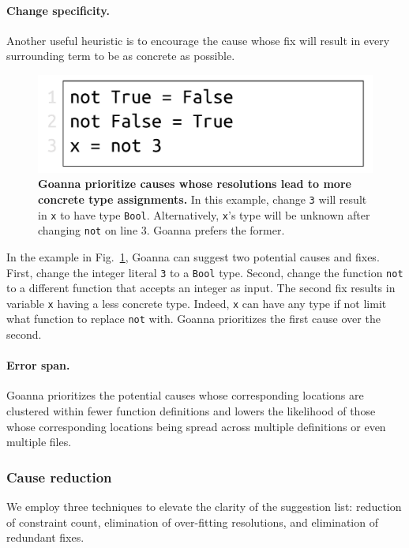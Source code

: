     \paragraph{Change specificity.}
	Another useful heuristic is to encourage the cause whose fix will result in every surrounding term to be as concrete as possible.
	
	
   \begin{figure}[ht!]
        \centering
        \includegraphics[width=0.5\linewidth]{images/Specificity}
        \caption[Goanna prioritize causes whose resolutions lead to more concrete type assignments]{\textbf{Goanna prioritize causes whose resolutions lead to more concrete type assignments.} In this example, change \texttt{3} will result in \texttt{x} to have type \texttt{Bool}. Alternatively, \texttt{x}'s type will be unknown after changing \texttt{not} on line 3. Goanna prefers the former.} 
        \label{fig:specificity}
    \end{figure}

    In the example in Fig.~\ref{fig:specificity}, Goanna can suggest two potential causes and fixes. First, change the integer literal \texttt{3} to a \texttt{Bool} type. Second, change the function \texttt{not} to a different function that accepts an integer as input. The second fix results in variable \texttt{x} having a less concrete type. Indeed, \texttt{x} can have any type if not limit what function to replace \texttt{not} with. Goanna prioritizes the first cause over the second. 

    \paragraph{Error span.}
    Goanna prioritizes the potential causes whose corresponding locations are clustered within fewer function definitions and lowers the likelihood of those whose corresponding locations being spread across multiple definitions or even multiple files.  

    
    \subsubsection{Cause reduction} \label{sub:optimization}
    
    We employ three techniques to elevate the clarity of the suggestion list: reduction of constraint count, elimination of over-fitting resolutions, and elimination of redundant fixes.

